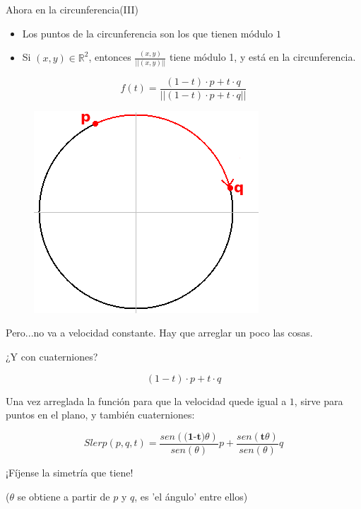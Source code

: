 \documentclass[10pt]{beamer}
\def\R{\mathbb{R}}
\begin{document}
\begin{frame}{Ahora en la circunferencia(III)}

\begin{itemize}
	\item Los puntos de la circunferencia son los que tienen módulo $1$
	\item Si $(x,y) \in \R^2$, entonces $\frac{(x,y)}{||(x,y)||}$ tiene módulo 1, y está en la circunferencia.
\end{itemize}

$$f(t) = \frac{(1-t) \cdot p + t\cdot q}{||(1-t)\cdot p+ t\cdot q||}$$

\begin{figure}
  	\centering
	\includegraphics[scale=0.44]{slerpR2_3_p.png}
\end{figure}

Pero...no va a velocidad constante. Hay que arreglar un poco las cosas.

\end{frame}

\begin{frame}{¿Y con cuaterniones?}



$$(1-t) \cdot p + t \cdot q$$

Una vez arreglada la función para que la velocidad quede igual a $1$, sirve para puntos en el plano, y también cuaterniones:

$$Slerp(p,q,t) = \frac{sen(\textbf{(1-t)}\theta)}{sen(\theta)} p + \frac{sen(\textbf{t}\theta)}{sen(\theta)} q$$ \pause

¡Fíjense la simetría que tiene!


($\theta$ se obtiene a partir de $p$ y $q$, es 'el ángulo' entre ellos)


\end{frame}
\end{document}
